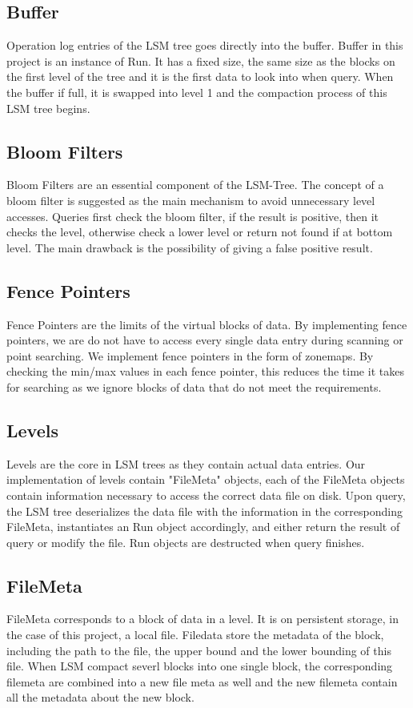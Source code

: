 \documentclass[sigconf]{acmart}
\begin{document}
    \subsection{Buffer}
    Operation log entries of the LSM tree goes directly into the buffer. Buffer in this project is an instance of Run. It has a fixed size, the same size as the blocks on the first level of the tree and it is the first data to look into when query. When the buffer if full, it is swapped into level 1 and the compaction process of this LSM tree begins.

    \subsection{Bloom Filters}
    Bloom Filters are an essential component of the LSM-Tree. The concept of a bloom filter is suggested as the main mechanism to avoid unnecessary level accesses. Queries first check the bloom filter, if the result is positive, then it checks the level, otherwise check a lower level or return not found if at bottom level. The main drawback is the possibility of giving a false positive result.

    \subsection{Fence Pointers}
    Fence Pointers are the limits of the virtual blocks of data. By implementing fence pointers, we are do not have to access every single data entry during scanning or point searching. We implement fence pointers in the form of zonemaps. By checking the min/max values in each fence pointer, this reduces the time it takes for searching as we ignore blocks of data that do not meet the requirements.

    \subsection{Levels}
    Levels are the core in LSM trees as they contain actual data entries. Our implementation of levels contain "FileMeta" objects, each of the FileMeta objects contain information necessary to access the correct data file on disk. Upon query, the LSM tree deserializes the data file with the information in the corresponding FileMeta, instantiates an Run object accordingly, and either return the result of query or modify the file. Run objects are destructed when query finishes.

    \subsection{FileMeta}
    FileMeta corresponds to a block of data in a level. It is on persistent storage, in the case of this project, a local file. Filedata store the metadata of the block, including the path to the file, the upper bound and the lower bounding of this file. When LSM compact severl blocks into one single block, the corresponding filemeta are combined into a new file meta as well and the new filemeta contain all the metadata about the new block.
\end{document}
